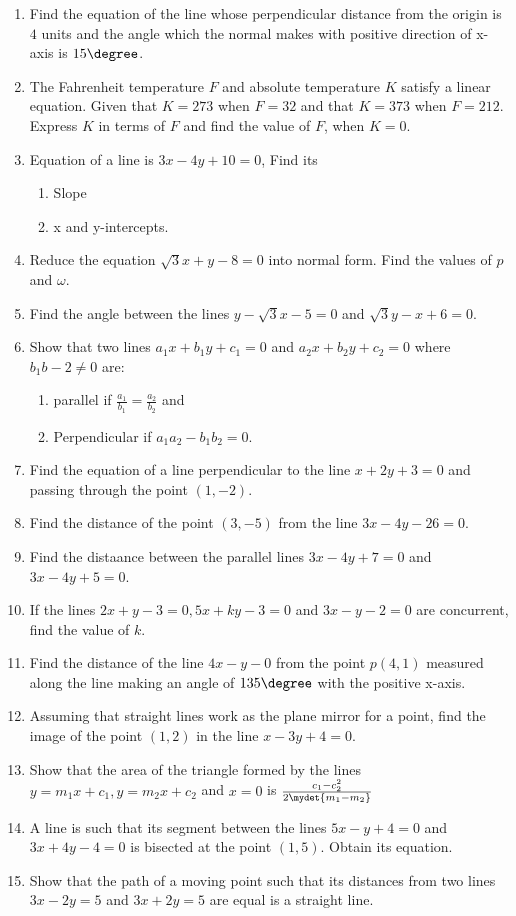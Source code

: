 \begin{enumerate}
\item Find the equation of the line whose perpendicular distance from the origin is $4$ units and the angle which the normal makes with positive direction of x-axis is $15\degree$.
\item The Fahrenheit temperature $F$ and  absolute temperature $K$ satisfy a linear equation. Given that $K=273$ when $F=32$ and that $K=373$ when $F=212$. Express $K$ in terms of $F$ and find the value of $F$, when $K=0$.
\item Equation of a line is $3x-4y+10=0$, Find its
\begin{enumerate}[label=(\roman*)]
\item  Slope
\item  x and y-intercepts.
\end{enumerate}
\item Reduce the equation $\sqrt3x+y-8=0$ into normal form. Find the values of $p$ and $\omega$.
\item Find the angle between the lines $y-\sqrt 3x-5=0$ and $\sqrt 3y-x+6=0$.
\item Show that two lines $a_1x+b_1y+c_1=0$ and $a_2x+b_2y+c_2=0$ where $b_1b-2\neq 0$ are:
\begin{enumerate}
\item parallel if $\frac{a_1}{b_1}=\frac{a_2}{b_2}$ and 
\item Perpendicular if $a_1a_2-b_1b_2=0$.
\end {enumerate}
\item Find the equation of a line perpendicular to the line $x+2y+3=0$ and passing through the point $(1,-2)$.
\item Find the distance of the point $(3,-5)$ from the line $3x-4y-26=0$.
\item Find the distaance between the parallel lines $3x-4y+7=0$ and $3x-4y+5=0$.
\item If the lines $2x+y-3=0, 5x+ky-3=0$ and $3x-y-2=0$ are concurrent, find the value of $k$.
\item Find the distance of the line $4x-y-0$ from the point $p(4,1)$ measured along the line making an angle of $135\degree$ with the positive x-axis.
\item Assuming that straight lines work as the plane mirror for a point, find the image of the point $(1,2)$ in the line $x-3y+4=0$.
\item Show that the area of the triangle formed by the lines $y=m_1x+c_1, y=m_2x+c_2$ and $x=0$ is $\frac{c_1-c_2^2}{2\mydet{m_1-m_2}}$
\item A line is such that its segment between the lines $5x-y+4=0$ and $3x+4y-4=0$ is bisected at the point $(1,5)$. Obtain its equation.
\item Show that the path of a moving point such that its distances from two lines $3x-2y=5$ and $3x+2y=5$ are equal is a straight line.
\end{enumerate}
 

